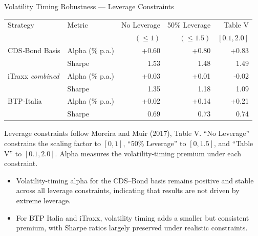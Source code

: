 \documentclass[aspectratio=169,11pt]{beamer}
\begin{document}
\begin{frame}[t]{Volatility Timing Robustness — Leverage Constraints}
\centering
\scriptsize
\setlength{\tabcolsep}{4pt}

\begin{threeparttable}
\begin{tabular}{llrrr}
\toprule
Strategy & Metric & No Leverage & 50\% Leverage & Table V \\
         &        & $(\leq 1)$  & $(\leq 1.5)$   & $[0.1,2.0]$ \\
\midrule
CDS\textit{-}Bond Basis   & Alpha (\% p.a.) & +0.60 & +0.80 & +0.83 \\
                          & Sharpe          & 1.53  & 1.48  & 1.49  \\
\addlinespace
iTraxx \textit{combined}  & Alpha (\% p.a.) & +0.03 & +0.01 & -0.02 \\
                          & Sharpe          & 1.35  & 1.18  & 1.09  \\
\addlinespace
BTP\textit{-}Italia       & Alpha (\% p.a.) & +0.02 & +0.14 & +0.21 \\
                          & Sharpe          & 0.69  & 0.73  & 0.74  \\
\bottomrule
\end{tabular}
\begin{tablenotes}
\tiny
\item Leverage constraints follow Moreira and Muir (2017), Table V. ``No Leverage'' constrains the scaling factor to $[0,1]$, ``50\% Leverage'' to $[0,1.5]$, and ``Table V'' to $[0.1,2.0]$. Alpha measures the volatility-timing premium under each constraint.
\end{tablenotes}
\end{threeparttable}

\vspace{0.25cm}

\tiny
\begin{itemize}
  \item Volatility-timing alpha for the CDS--Bond basis remains positive and stable across all leverage constraints, indicating that results are not driven by extreme leverage.
  \item For BTP Italia and iTraxx, volatility timing adds a smaller but consistent premium, with Sharpe ratios largely preserved under realistic constraints.
\end{itemize}

\end{frame}
\end{document}
